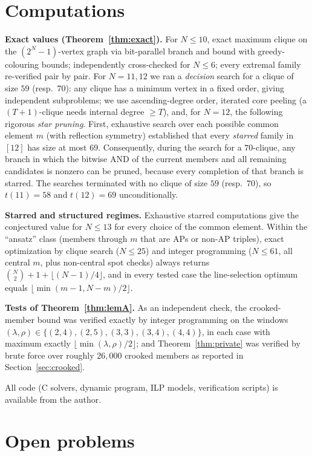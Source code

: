 \documentclass[11pt]{article}
\theoremstyle{definition}
\begin{document}
\section{Computations}\label{sec:comp}

\textbf{Exact values (Theorem~\ref{thm:exact}).} For $N\le 10$, exact maximum clique on the $(2^N-1)$-vertex graph via bit-parallel branch and bound with greedy-colouring bounds; independently cross-checked for $N\le 6$; every extremal family re-verified pair by pair. For $N=11,12$ we ran a \emph{decision} search for a clique of size $59$ (resp.\ $70$): any clique has a minimum vertex in a fixed order, giving independent subproblems; we use ascending-degree order, iterated core peeling (a $(T{+}1)$-clique needs internal degree $\ge T$), and, for $N=12$, the following rigorous \emph{star pruning}. First, exhaustive search over each possible common element $m$ (with reflection symmetry) established that every \emph{starred} family in $[12]$ has size at most $69$. Consequently, during the search for a $70$-clique, any branch in which the bitwise AND of the current members and all remaining candidates is nonzero can be pruned, because every completion of that branch is starred. The searches terminated with no clique of size $59$ (resp.\ $70$), so $t(11)=58$ and $t(12)=69$ unconditionally.

\textbf{Starred and structured regimes.} Exhaustive starred computations give the conjectured value for $N\le13$ for every choice of the common element. Within the ``ansatz'' class (members through $m$ that are APs or non-AP triples), exact optimization by clique search ($N\le25$) and integer programming ($N\le61$, all central $m$, plus non-central spot checks) always returns $\binom N2+1+\lfloor (N-1)/4\rfloor$, and in every tested case the line-selection optimum equals $\lfloor\min(m-1,N-m)/2\rfloor$.

\textbf{Tests of Theorem~\ref{thm:lemA}.} As an independent check, the crooked-member bound was verified exactly by integer programming on the windows $(\lambda,\rho)\in\{(2,4),(2,5),(3,3),(3,4),(4,4)\}$, in each case with maximum exactly $\lfloor\min(\lambda,\rho)/2\rfloor$; and Theorem~\ref{thm:private} was verified by brute force over roughly $26{,}000$ crooked members as reported in Section~\ref{sec:crooked}.

All code (C solvers, dynamic program, ILP models, verification scripts) is available from the author.

\section{Open problems}\label{sec:open}
\end{document}
